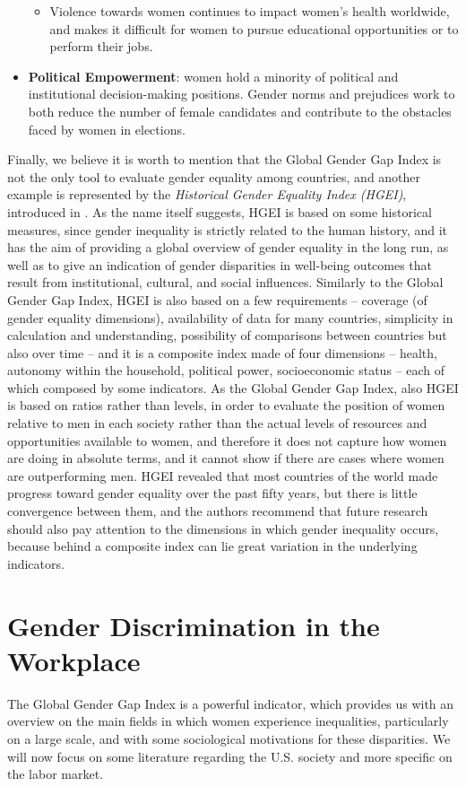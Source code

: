 \begin{itemize}
\begin{itemize}
\item Violence towards women continues to impact women's health worldwide, and makes it difficult for women to pursue educational opportunities or to perform their jobs.
\end{itemize}
\item \textbf{Political Empowerment}: women hold a minority of political and institutional decision-making positions. Gender norms and prejudices work to both reduce the number of female candidates and contribute to the obstacles faced by women in elections.
\end{itemize}

Finally, we believe it is worth to mention that the Global Gender Gap Index is not the only tool to evaluate gender equality among countries, and another example is represented by the \textit{Historical Gender Equality Index (HGEI)}, introduced in \cite{dilli2019introducing}. As the name itself suggests, HGEI is based on some historical measures, since gender inequality is strictly related to the human history, and it has the aim of providing a global overview of gender equality in the long run, as well as to give an indication of gender disparities in well-being outcomes that result from institutional, cultural, and social influences.
Similarly to the Global Gender Gap Index, HGEI is also based on a few requirements -- coverage (of gender equality dimensions), availability of data for many countries, simplicity in calculation and understanding, possibility of comparisons between countries but also over time -- and it is a composite index made of four dimensions -- health, autonomy within the household, political power, socioeconomic status -- each of which composed by some indicators.
As the Global Gender Gap Index, also HGEI is based on ratios rather than levels, in order to evaluate the position of women relative to men in each society rather than the actual levels of resources and opportunities available to women, and therefore it does not capture how women are doing in absolute terms, and it cannot show if there are cases where women are outperforming men.
HGEI revealed that most countries of the world made progress toward gender equality over the past fifty years, but there is little convergence between them, and the authors recommend that future research should also pay attention to the dimensions in which gender inequality occurs, because behind a composite index can lie great variation in the underlying indicators.


\section{Gender Discrimination in the Workplace}
The Global Gender Gap Index is a powerful indicator, which provides us with an overview on the main fields in which women experience inequalities, particularly on a large scale, and with some sociological motivations for these disparities. We will now focus on some literature regarding the U.S. society and more specific on the labor market.


